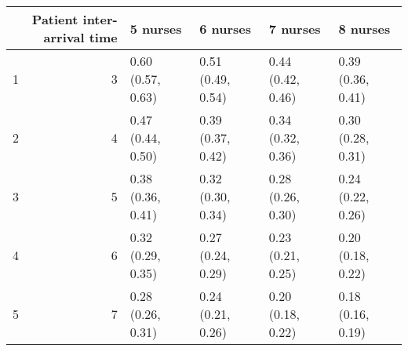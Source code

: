 \begin{table}[ht]
\centering
\begin{tabular}{rrllll}
  \hline
 & Patient inter-arrival time & 5 nurses & 6 nurses & 7 nurses & 8 nurses \\ 
  \hline
1 &   3 & 0.60 (0.57, 0.63) & 0.51 (0.49, 0.54) & 0.44 (0.42, 0.46) & 0.39 (0.36, 0.41) \\ 
  2 &   4 & 0.47 (0.44, 0.50) & 0.39 (0.37, 0.42) & 0.34 (0.32, 0.36) & 0.30 (0.28, 0.31) \\ 
  3 &   5 & 0.38 (0.36, 0.41) & 0.32 (0.30, 0.34) & 0.28 (0.26, 0.30) & 0.24 (0.22, 0.26) \\ 
  4 &   6 & 0.32 (0.29, 0.35) & 0.27 (0.24, 0.29) & 0.23 (0.21, 0.25) & 0.20 (0.18, 0.22) \\ 
  5 &   7 & 0.28 (0.26, 0.31) & 0.24 (0.21, 0.26) & 0.20 (0.18, 0.22) & 0.18 (0.16, 0.19) \\ 
   \hline
\end{tabular}
\end{table}
